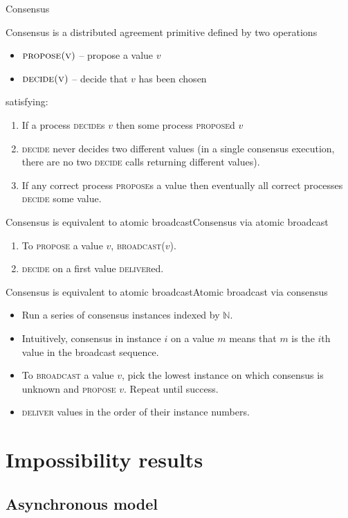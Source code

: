 \documentclass{beamer}
\begin{document}
\begin{frame}{Consensus}
  \begin{definition}
    Consensus is a distributed agreement primitive defined by two operations
    \begin{itemize}
      \item $\textsc{propose(v)}$ -- propose a value $v$
      \item $\textsc{decide(v)}$ -- decide that $v$ has been chosen
    \end{itemize}
    satisfying:
    \begin{enumerate}
      \item If a process \textsc{decide}s $v$ then some process \textsc{propose}d $v$
      \item \textsc{decide} \alert{never} decides two different values (in a single consensus execution, there are no two \textsc{decide} calls returning different values).
      \item If any correct process \textsc{propose}s a value then eventually all correct processes \textsc{decide} some value.
    \end{enumerate}
  \end{definition}
\end{frame}

\begin{frame}{Consensus is equivalent to atomic broadcast}{Consensus via atomic broadcast}
  \begin{enumerate}
    \item To \textsc{propose} a value $v$, \textsc{broadcast}($v$).
    \item \textsc{decide} on a first value \textsc{deliver}ed.
  \end{enumerate}
\end{frame}

\begin{frame}{Consensus is equivalent to atomic broadcast}{Atomic broadcast via consensus}
  \begin{itemize}
    \item Run a series of consensus instances indexed by $\mathbb{N}$.
    \item Intuitively, consensus in instance $i$ on a value $m$ means that $m$ is the $i$th value in the broadcast sequence.
    \item To \textsc{broadcast} a value $v$, pick the lowest instance on which consensus is unknown and \textsc{propose} $v$. Repeat until success.
    \item \textsc{deliver} values in the order of their instance numbers.
  \end{itemize}
\end{frame}

\section{Impossibility results}
\subsection{Asynchronous model}
\end{document}
